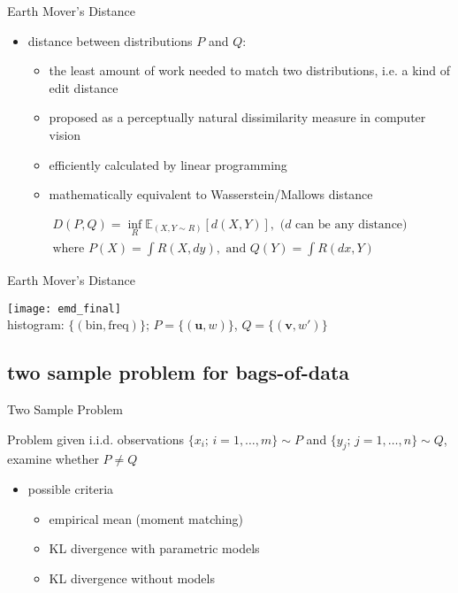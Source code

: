 \documentclass[fleqn,aspectratio=1610]{beamer}
\begin{document}
\begin{frame}[label={sec:org53e6d8d}]{Earth Mover's Distance}
\begin{itemize}
\item distance between distributions \(P\) and \(Q\):
\begin{itemize}
\item the least amount of work needed to match two distributions,
i.e. a kind of edit distance
\item proposed 
as a perceptually natural dissimilarity measure 
in computer vision
\item efficiently calculated by linear programming
\item mathematically equivalent to Wasserstein/Mallows distance
\end{itemize}
\end{itemize}

\begin{multline}
  D(P,Q)=\inf_{R} \mathbb{E}_{(X,Y\sim R)}[d(X,Y)],\text{ (\(d\) can be any distance)} \\
  \text{where } P(X)=\int R(X,dy),
  \text{ and } Q(Y)=\int R(dx,Y)
\end{multline}
\end{frame}

\begin{frame}[label={sec:org411d97d}]{Earth Mover's Distance}
\begin{center}
\texttt{[image: emd\_final]}
\\[10pt]
histogram: \(\{(\text{bin}, \text{freq})\}\);
\(P=\{(\boldsymbol{u},w)\}\), 
\(Q=\{(\boldsymbol{v},w')\}\)
\end{center}
\end{frame}


\subsection{two sample problem for bags-of-data}
\label{sec:org7276be2}
\begin{frame}[label={sec:orgccde405}]{Two Sample Problem}
\begin{alertblock}{Problem}
given i.i.d. observations 
\(\{x_{i};\,i=1,\dotsc,m\}\sim P\) and 
\(\{y_{j};\,j=1,\dotsc,n\}\sim Q\),
examine whether \(P\not=Q\)
\bigskip
\end{alertblock}
\begin{itemize}
\item possible criteria
\begin{itemize}
\item empirical mean (moment matching)
\item KL divergence with parametric models
\item KL divergence without models
\end{itemize}
\end{itemize}
\end{frame}
\end{document}
